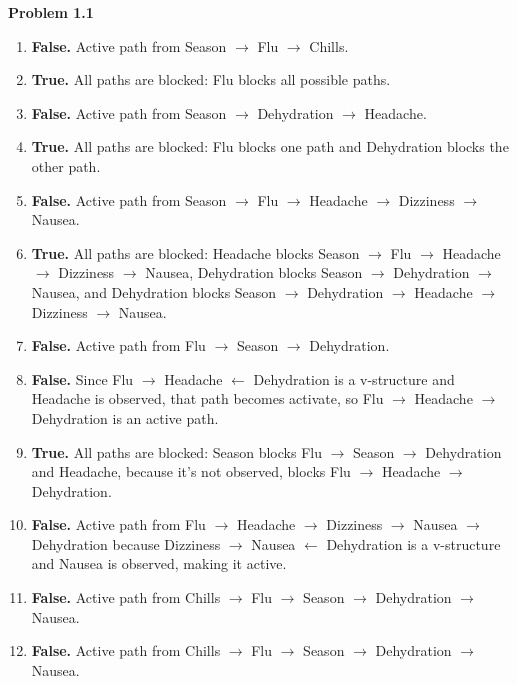\documentclass[12pt]{article}
\begin{document}
\noindent

\textbf{Problem 1.1}
\begin{enumerate}
	\item \textbf{False.} Active path from Season $\rightarrow$ Flu $\rightarrow$ Chills.
	\item \textbf{True.} All paths are blocked: Flu blocks all possible paths.
	\item \textbf{False.} Active path from Season $\rightarrow$ Dehydration $\rightarrow$ Headache.
	\item \textbf{True.} All paths are blocked: Flu blocks one path and Dehydration blocks the other path.
	\item \textbf{False.} Active path from Season $\rightarrow$ Flu $\rightarrow$ Headache $\rightarrow$ Dizziness $\rightarrow$ Nausea.
	\item \textbf{True.} All paths are blocked: Headache blocks Season $\rightarrow$ Flu $\rightarrow$ Headache $\rightarrow$ Dizziness $\rightarrow$ Nausea, Dehydration blocks Season $\rightarrow$ Dehydration $\rightarrow$ Nausea, and Dehydration blocks Season $\rightarrow$ Dehydration $\rightarrow$ Headache $\rightarrow$ Dizziness $\rightarrow$ Nausea.
	\item \textbf{False.} Active path from Flu $\rightarrow$ Season $\rightarrow$ Dehydration.
	\item \textbf{False.} Since Flu $\rightarrow$ Headache $\leftarrow$ Dehydration is a v-structure and Headache is observed, that path becomes activate, so Flu $\rightarrow$ Headache $\rightarrow$ Dehydration is an active path.
	\item \textbf{True.} All paths are blocked: Season blocks Flu $\rightarrow$ Season $\rightarrow$ Dehydration and Headache, because it's not observed, blocks Flu $\rightarrow$ Headache $\rightarrow$ Dehydration.
	\item \textbf{False.} Active path from Flu $\rightarrow$ Headache $\rightarrow$ Dizziness $\rightarrow$ Nausea $\rightarrow$ Dehydration because Dizziness $\rightarrow$ Nausea $\leftarrow$ Dehydration is a v-structure and Nausea is observed, making it active.
	\item \textbf{False.} Active path from Chills $\rightarrow$ Flu $\rightarrow$ Season $\rightarrow$ Dehydration $\rightarrow$ Nausea.
	\item \textbf{False.} Active path from Chills $\rightarrow$ Flu $\rightarrow$ Season $\rightarrow$ Dehydration $\rightarrow$ Nausea.
\end{enumerate}
\end{document}
